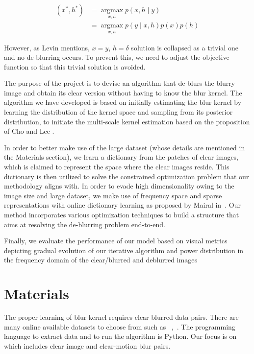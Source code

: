 \documentclass{article}
\theoremstyle{definition}
\begin{document}
$$
\begin{aligned}
\left(x^*, h^*\right) & =\underset{x, h}{\operatorname{argmax}} p(x, h \mid y) \\
& =\underset{x, h}{\operatorname{argmax}} p(y \mid x, h) p(x) p(h)
\end{aligned}
$$


However, as Levin \cite{Levin-deblur} mentions, $x=y$, $h=\delta$ solution is collapsed as a trivial one and no de-blurring occurs. To prevent this, we need to adjust the objective function so that this trivial solution is avoided. 


The purpose of the project is to devise an algorithm that de-blurs the blurry image and obtain its clear version without having to know the blur kernel.
The algorithm we have developed is based on initially estimating the blur kernel by learning the distribution of the kernel space and sampling from its posterior distribution, to initiate the multi-scale kernel estimation based on the proposition of Cho and Lee \cite{cho-fast}. 


In order to better make use of the large dataset (whose details are mentioned in the Materials section), we learn a dictionary from the patches of clear images, which is claimed to represent the space where the clear images reside. This dictionary is then utilized to solve the constrained optimization problem that our methodology aligns with. In order to evade high dimensionality owing to the image size and large dataset, we make use of frequency space and sparse representations with online dictionary learning as proposed by Mairal in~\cite{OnlineDLearn}. Our method incorporates various optimization techniques to build a structure that aims at resolving the de-blurring problem end-to-end.

Finally, we evaluate the performance of our model based on visual metrics depicting gradual evolution of our iterative algorithm and power distribution in the frequency domain of the clear/blurred and deblurred images

\section{Materials}



The proper learning of blur kernel requires clear-blurred data pairs. There are many online available datasets to choose from such as ~\cite{D1},~\cite{D2}. The programming language to extract data and to run the algorithm is Python. Our focus is on~\cite{D1} which includes clear image and clear-motion blur pairs. 
\end{document}
